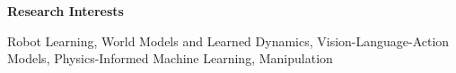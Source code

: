 \begin{center}
    \textbf{Research Interests}
\end{center}

Robot Learning, World Models and Learned Dynamics, Vision-Language-Action Models, Physics-Informed Machine Learning, Manipulation
